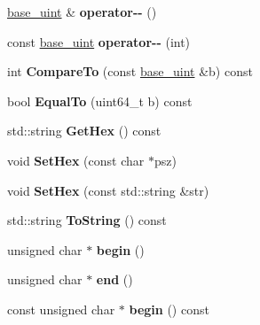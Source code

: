 \begin{DoxyCompactItemize}
\item 
\mbox{\label{classbase__uint_a2cc581d32afac619acd12601ddea4180}} 
\mbox{\hyperlink{classbase__uint}{base\+\_\+uint}} \& {\bfseries operator-\/-\/} ()
\item 
\mbox{\label{classbase__uint_a78a8e46c434c0e61be86282fe9543587}} 
const \mbox{\hyperlink{classbase__uint}{base\+\_\+uint}} {\bfseries operator-\/-\/} (int)
\item 
\mbox{\label{classbase__uint_a1196e0ff823836958e45aec3a246b9d2}} 
int {\bfseries Compare\+To} (const \mbox{\hyperlink{classbase__uint}{base\+\_\+uint}} \&b) const
\item 
\mbox{\label{classbase__uint_aaba2c27863f6d5077ed21cd353766168}} 
bool {\bfseries Equal\+To} (uint64\+\_\+t b) const
\item 
\mbox{\label{classbase__uint_ae5e7b7481de91ebead20eebd5d685441}} 
std\+::string {\bfseries Get\+Hex} () const
\item 
\mbox{\label{classbase__uint_ade1a897fac931f28f54998c92c797228}} 
void {\bfseries Set\+Hex} (const char $\ast$psz)
\item 
\mbox{\label{classbase__uint_afe3600e6ae4e9f69e1c036581a2716c8}} 
void {\bfseries Set\+Hex} (const std\+::string \&str)
\item 
\mbox{\label{classbase__uint_acccba4d9d51a0c36261718ca0cbb293b}} 
std\+::string {\bfseries To\+String} () const
\item 
\mbox{\label{classbase__uint_aaa32054bf4e8fbb31d54a75f6065174d}} 
unsigned char $\ast$ {\bfseries begin} ()
\item 
\mbox{\label{classbase__uint_a76539ef6be800bc02e4038f457a4f74a}} 
unsigned char $\ast$ {\bfseries end} ()
\item 
\mbox{\label{classbase__uint_a41237a3bb063583fa001e96f654fbb19}} 
const unsigned char $\ast$ {\bfseries begin} () const
\item 

\end{DoxyCompactItemize}
